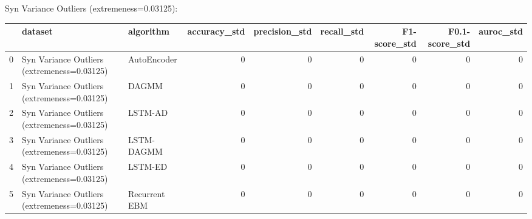 Syn Variance Outliers (extremeness=0.03125):

\begin{tabular}{rllrrrrrr}
\hline
    & dataset                                     & algorithm     &   accuracy\_std &   precision\_std &   recall\_std &   F1-score\_std &   F0.1-score\_std &   auroc\_std \\
\hline
  0 & Syn Variance Outliers (extremeness=0.03125) & AutoEncoder   &              0 &               0 &            0 &              0 &                0 &           0 \\
  1 & Syn Variance Outliers (extremeness=0.03125) & DAGMM         &              0 &               0 &            0 &              0 &                0 &           0 \\
  2 & Syn Variance Outliers (extremeness=0.03125) & LSTM-AD       &              0 &               0 &            0 &              0 &                0 &           0 \\
  3 & Syn Variance Outliers (extremeness=0.03125) & LSTM-DAGMM    &              0 &               0 &            0 &              0 &                0 &           0 \\
  4 & Syn Variance Outliers (extremeness=0.03125) & LSTM-ED       &              0 &               0 &            0 &              0 &                0 &           0 \\
  5 & Syn Variance Outliers (extremeness=0.03125) & Recurrent EBM &              0 &               0 &            0 &              0 &                0 &           0 \\
\hline
\end{tabular}

